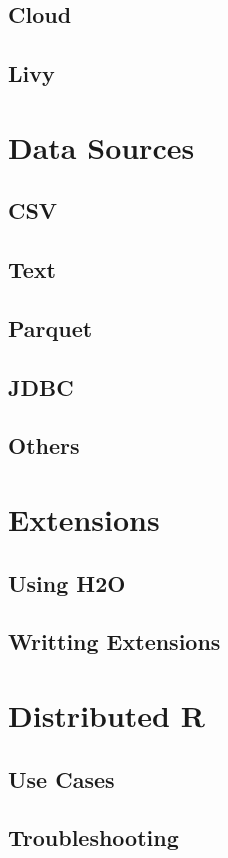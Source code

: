 \documentclass[]{book}
\theoremstyle{definition}
\theoremstyle{definition}
\theoremstyle{definition}
\theoremstyle{remark}
\begin{document}
\section{Cloud}\label{cloud}

\section{Livy}\label{livy}

\chapter{Data Sources}\label{data}

\section{CSV}\label{csv}

\section{Text}\label{text}

\section{Parquet}\label{parquet}

\section{JDBC}\label{jdbc}

\section{Others}\label{others}

\chapter{Extensions}\label{extensions}

\section{Using H2O}\label{using-h2o}

\section{Writting Extensions}\label{writting-extensions}

\chapter{Distributed R}\label{distributed}

\section{Use Cases}\label{use-cases}

\section{Troubleshooting}\label{troubleshooting}


\end{document}
